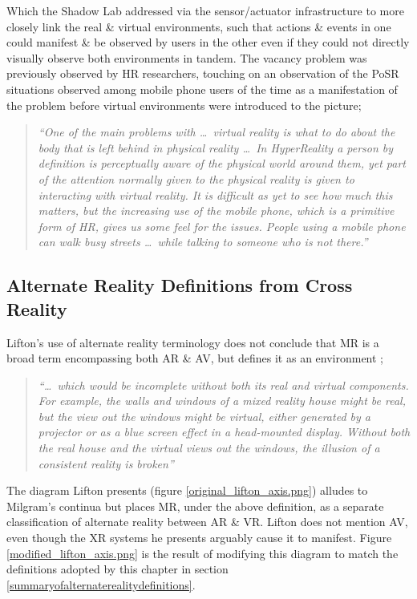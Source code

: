 Which the Shadow Lab addressed via the sensor/actuator infrastructure to more closely link the real \& virtual environments, such that actions \& events in one could manifest \& be observed by users in the other even if they could not directly visually observe both environments in tandem. The vacancy problem was previously observed by HR researchers, touching on an observation of the PoSR situations observed among mobile phone users of the time as a manifestation of the problem before virtual environments were introduced to the picture; %

\begin{quote}
	\textit{``One of the main problems with \ldots\ virtual reality is what to do about the body that is left behind in physical reality \ldots\ In HyperReality a person by definition is perceptually aware of the physical world around them, yet part of the attention normally given to the physical reality is given to interacting with virtual reality. It is difficult as yet to see how much this matters, but the increasing use of the mobile phone, which is a primitive form of HR, gives us some feel for the issues. People using a mobile phone can walk busy streets \ldots\ while talking to someone who is not there.''}~\cite{Terashima2001}
\end{quote}


\subsection{Alternate Reality Definitions from Cross Reality}

Lifton's use of alternate reality terminology does not conclude that MR is a broad term encompassing both AR \& AV, but defines it as an environment ;

\begin{quote}
	\textit{``\ldots\ which would be incomplete without both its real and virtual components. For example, the walls and windows of a mixed reality house might be real, but the view out the windows might be virtual, either generated by a projector or as a blue screen effect in a head-mounted display. Without both the real house and the virtual views out the windows, the illusion of a consistent reality is broken''}~\cite{Lifton2007a}
\end{quote}

The diagram Lifton presents (figure \ref{original_lifton_axis.png}) alludes to Milgram's continua but places MR, under the above definition, as a separate classification of alternate reality between AR \& VR. Lifton does not mention AV, even though the XR systems he presents arguably cause it to manifest. Figure \ref{modified_lifton_axis.png} is the result of modifying this diagram to match the definitions adopted by this chapter in section \ref{summaryofalternaterealitydefinitions}.

